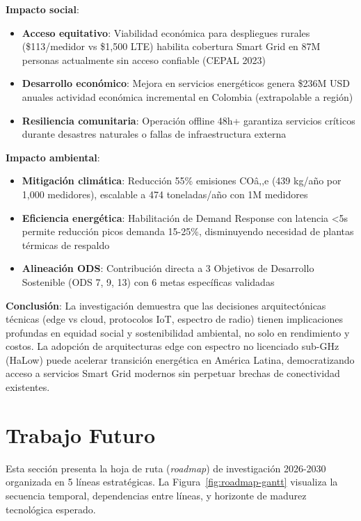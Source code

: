 \textbf{Impacto social}:
\begin{itemize}
    \item \textbf{Acceso equitativo}: Viabilidad económica para despliegues rurales (\$113/medidor vs \$1,500 LTE) habilita cobertura Smart Grid en 87M personas actualmente sin acceso confiable (CEPAL 2023)
    \item \textbf{Desarrollo económico}: Mejora en servicios energéticos genera \$236M USD anuales actividad económica incremental en Colombia (extrapolable a región)
    \item \textbf{Resiliencia comunitaria}: Operación offline 48h+ garantiza servicios críticos durante desastres naturales o fallas de infraestructura externa
\end{itemize}

\textbf{Impacto ambiental}:
\begin{itemize}
    \item \textbf{Mitigación climática}: Reducción 55\% emisiones COâ‚‚e (439 kg/año por 1,000 medidores), escalable a 474 toneladas/año con 1M medidores
    \item \textbf{Eficiencia energética}: Habilitación de Demand Response con latencia <5s permite reducción picos demanda 15-25\%, disminuyendo necesidad de plantas térmicas de respaldo
    \item \textbf{Alineación ODS}: Contribución directa a 3 Objetivos de Desarrollo Sostenible (ODS 7, 9, 13) con 6 metas específicas validadas
\end{itemize}

\textbf{Conclusión}: La investigación demuestra que las decisiones arquitectónicas técnicas (edge vs cloud, protocolos IoT, espectro de radio) tienen implicaciones profundas en equidad social y sostenibilidad ambiental, no solo en rendimiento y costos. La adopción de arquitecturas edge con espectro no licenciado sub-GHz (HaLow) puede acelerar transición energética en América Latina, democratizando acceso a servicios Smart Grid modernos sin perpetuar brechas de conectividad existentes.

\section{Trabajo Futuro}

Esta sección presenta la hoja de ruta (\textit{roadmap}) de investigación 2026-2030 organizada en 5 líneas estratégicas. La Figura~\ref{fig:roadmap-gantt} visualiza la secuencia temporal, dependencias entre líneas, y horizonte de madurez tecnológica esperado.

